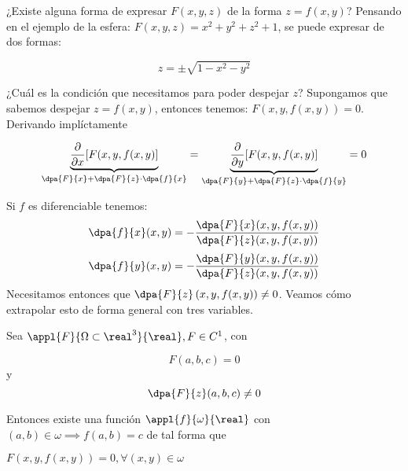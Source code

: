 ¿Existe alguna forma de expresar $F(x,y,z)$ de la forma $z=f(x,y)$? Pensando en el ejemplo de la esfera: $F(x,y,z) = x^2+y^2+z^2+1$, se puede expresar de dos formas:

\[ z = \pm \sqrt{1 - x^2 - y^2} \]

¿Cuál es la condición que necesitamos para poder despejar $z$? Supongamos que sabemos despejar $z=f(x,y)$, entonces tenemos: $F(x,y,f(x,y)) = 0$. Derivando implíctamente

\[ \underbrace{\frac{\partial}{\partial x} [F(x,y,f(x,y)]}_{\dpa{F}{x} + \dpa{F}{z}\cdot\dpa{f}{x}}= \underbrace{\frac{\partial}{\partial y} [F(x,y,f(x,y)]}_{\dpa{F}{y} + \dpa{F}{z}\cdot\dpa{f}{y}} = 0 \]

Si $f$ es diferenciable tenemos:
$$\dpa{f}{x}(x,y) = - \frac{\dpa{F}{x}(x,y,f(x,y))}{\dpa{F}{z}(x,y,f(x,y))}$$
$$\dpa{f}{y}(x,y) = - \frac{\dpa{F}{y}(x,y,f(x,y))}{\dpa{F}{z}(x,y,f(x,y))}$$
Necesitamos entonces que $\displaystyle\dpa{F}{z}\left(x,y,f(x,y)\right) \neq 0$. Veamos cómo extrapolar esto de forma general con tres variables.

\begin{theorem} Sea $\appl{F}{\Omega\subset\real^3}{\real}, F\in C^1$, con

\[ F(a,b,c) = 0 \] y \[ \dpa{F}{z}(a,b,c)\neq 0 \]

Entonces existe una función $\appl{f}{\omega}{\real}$ con $(a,b)\in \omega \implies  f(a,b) = c$ de tal forma que

$F(x,y,f(x,y)) = 0, \forall(x,y)\in \omega$

\end{theorem}

